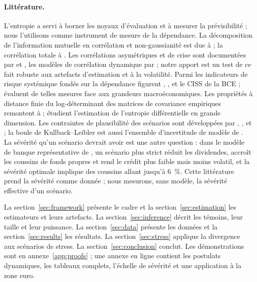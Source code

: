 \documentclass[12pt]{article}
\theoremstyle{definition}
\begin{document}
\begin{doublespace}
\paragraph{Littérature.} L'entropie a servi à borner les noyaux
d'évaluation \citep{stutzer1996,backus2014} et à mesurer la prévisibilité
\citep{maasoumi2002} ; nous l'utilisons comme instrument de mesure de la
dépendance. La décomposition de l'information mutuelle en corrélation et
non-gaussianité est due à \citet{cardoso2003} ; la corrélation totale à
\citet{watanabe1960}. Les corrélations asymétriques et de crise sont
documentées par \citet{longin2001} et \citet{ang2002}, les modèles de
corrélation dynamique par \citet{engle2002} ; notre apport est un test de ce
fait robuste aux artefacts d'estimation et à la volatilité. Parmi les
indicateurs de risque systémique fondés sur la dépendance figurent
\citet{kritzman2011}, \citet{billio2012}, \citet{diebold2014} et le CISS de
la BCE \citep{hollo2012} ; \citet{giglio2016} évaluent de telles mesures
face aux grandeurs macroéconomiques. Les propriétés à distance finie du
log-déterminant des matrices de covariance empiriques remontent à
\citet{bartlett1950} ; \citet{cai2015} étudient l'estimation de l'entropie
différentielle en grande dimension. Les contraintes de plausibilité des
scénarios sont développées par \citet{breuer2009}, \citet{breuer2013},
\citet{glasserman2014} et \citet{glasserman2015} ; la boule de
Kullback--Leibler est aussi l'ensemble d'incertitude de modèle de
\citet{hansen2008}.
La sévérité qu'un scénario devrait avoir est une autre question : dans le
modèle de banque représentative de \citet{fischer2024}, un scénario plus strict
réduit les dividendes, accroît les coussins de fonds propres et rend le crédit
plus faible mais moins volatil, et la sévérité optimale implique des coussins
allant jusqu'à 6~\%. Cette littérature prend la sévérité comme donnée ; nous
mesurons, sans modèle, la sévérité effective d'un scénario.

La section~\ref{sec:framework} présente le cadre et la
section~\ref{sec:estimation} les estimateurs et leurs artefacts. La
section~\ref{sec:inference} décrit les témoins, leur taille et leur
puissance. La section~\ref{sec:data} présente les données et la
section~\ref{sec:results} les résultats. La section~\ref{sec:stress} applique
la divergence aux scénarios de stress. La section~\ref{sec:conclusion}
conclut. Les démonstrations sont en annexe~\ref{app:proofs} ; une annexe en
ligne contient les postulats dynamiques, les tableaux complets, l'échelle de
sévérité et une application à la zone euro.


\end{doublespace}
\end{document}
